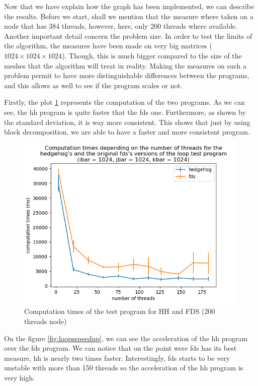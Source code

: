 Now that we have explain how the graph has been implemented, we can describe the
results. Before we start, shall we mention that the measure where taken on a
node that has 384 threads, however, here, only 200 threads where available.
Another important detail concern the problem size. In order to test the limits
of the algorithm, the measures have been made on very big matrices
($1024\times1024\times1024$). Though, this is much bigger compared to the size
of the meshes that the algorithm will treat in reality. Making the measures on
such a problem permit to have more distinguishable differences between the
programs, and this allows as well to see if the program scales or not.

Firstly, the plot \ref{fig:loopscomptime} represents the computation of the two
programs. As we can see, the \gls{hh} program is quite faster that the
\gls{fds} one. Furthermore, as shown by the standard deviation, it is way more
consistent. This shows that just by using block decomposition, we are able to
have a faster and more consistent program.

\begin{figure}[ht!]
  \begin{center}
    \includegraphics[scale=0.6]{img/fds-loops/times.png}
    \caption{Computation times of the test program for HH and FDS (200 threads node)}
    \label{fig:loopscomptime}
  \end{center}
\end{figure}

On the figure \ref{fig:loopsspeedup}, we can see the acceleration of the
\gls{hh} program over the \gls{fds} program. We can notice that on the point
were \gls{fds} has its best measure, \gls{hh} is nearly two times faster.
Interestingly, \gls{fds} starts to be very unstable with more than 150 threads
so the acceleration of the \gls{hh} program is very high.

